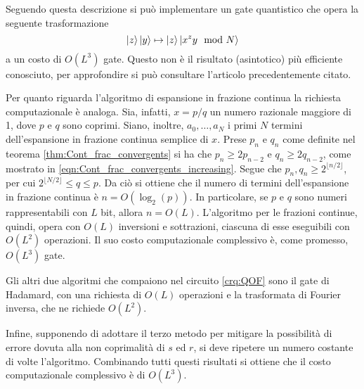 \begin{algo}
 Seguendo questa descrizione si può implementare un gate quantistico che opera la seguente trasformazione
 \begin{equation}
 \ket{z}\ket{y} \mapsto \ket{z}\ket{x^zy \mod N}
 \end{equation}
 a un costo di $O(L^3)$ gate. 
 Questo non è il risultato (asintotico) più efficiente conosciuto, per approfondire si può consultare l'articolo precedentemente citato.
\end{algo}

Per quanto riguarda l'algoritmo di espansione in frazione continua la richiesta computazionale è analoga. 
Sia, infatti, $x = p/q$ un numero razionale maggiore di 1, dove $p$ e $q$ sono coprimi.
Siano, inoltre, $a_0, \dots, a_N$ i primi $N$ termini dell'espansione in frazione continua semplice di $x$.
Prese $p_n$ e $q_n$ come definite nel teorema \ref{thm:Cont_frac_convergents} si ha che $p_n \geq 2p_{n-2}$ e $q_n \geq 2q_{n-2}$, come mostrato in \eqref{eqn:Cont_frac_convergents_increasing}.
Segue che $p_n, q_n \geq 2^{\lfloor n/2 \rfloor}$, per cui $2^{\lfloor N/2 \rfloor} \leq q \leq p$. 
Da ciò si ottiene che il numero di termini dell'espansione in frazione continua è $n = O(\log_2(p))$.
In particolare, se $p$ e $q$ sono numeri rappresentabili con $L$ bit, allora $n = O(L)$.
L'algoritmo per le frazioni continue, quindi, opera con $O(L)$ inversioni e sottrazioni, ciascuna di esse eseguibili con $O(L^2)$ operazioni.
Il suo costo computazionale complessivo è, come promesso, $O(L^3)$ gate.

Gli altri due algoritmi che compaiono nel circuito \ref{crq:QOF} sono il gate di Hadamard, con una richiesta di $O(L)$ operazioni e la trasformata di Fourier inversa, che ne richiede $O(L^2)$.

Infine, supponendo di adottare il terzo metodo per mitigare la possibilità di errore dovuta alla non coprimalità di $s$ ed $r$, si deve ripetere un numero costante di volte l'algoritmo.
Combinando tutti questi risultati si ottiene che il costo computazionale complessivo è di $O(L^3)$.

